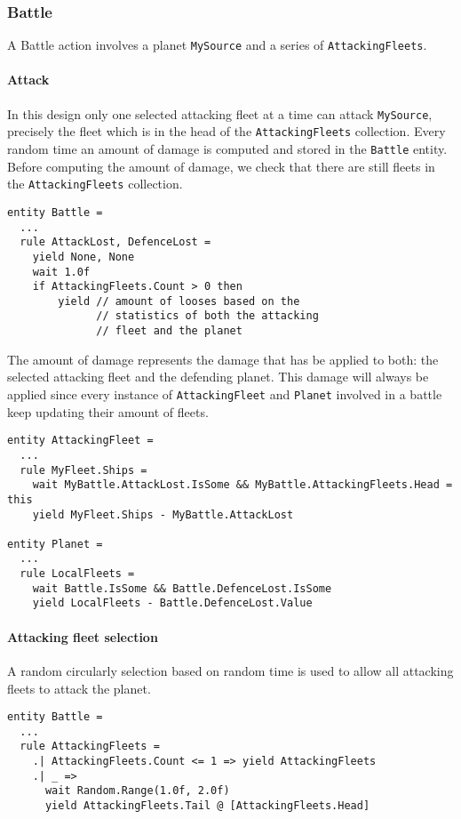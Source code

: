 \subsubsection{Battle}
\noindent
A Battle action involves a planet \texttt{MySource} and a series of \texttt{AttackingFleets}.
\paragraph{Attack} In this design only one selected attacking fleet at a time can attack \texttt{MySource}, precisely the fleet which is in the head of the \texttt{AttackingFleets} collection. Every random time an amount of damage is computed and stored in the \texttt{Battle} entity. Before computing the amount of damage, we check that there are still fleets in the \texttt{AttackingFleets} collection.

\begin{lstlisting}
entity Battle =
  ...
  rule AttackLost, DefenceLost =
    yield None, None
    wait 1.0f
    if AttackingFleets.Count > 0 then
        yield // amount of looses based on the  
              // statistics of both the attacking 
              // fleet and the planet	   
\end{lstlisting}

The amount of damage represents the damage that has be applied to both: the selected attacking fleet and the defending planet. This damage will always be applied since every instance of \texttt{AttackingFleet} and \texttt{Planet} involved in a battle keep updating their amount of fleets.


\begin{lstlisting}
entity AttackingFleet =
  ...
  rule MyFleet.Ships =
    wait MyBattle.AttackLost.IsSome && MyBattle.AttackingFleets.Head = this
    yield MyFleet.Ships - MyBattle.AttackLost
    
entity Planet =
  ...
  rule LocalFleets =
    wait Battle.IsSome && Battle.DefenceLost.IsSome
    yield LocalFleets - Battle.DefenceLost.Value
\end{lstlisting}

\paragraph{Attacking fleet selection}
A random circularly selection based on random time is used to allow all attacking fleets to attack the planet.
\begin{lstlisting}
entity Battle =
  ...
  rule AttackingFleets =
    .| AttackingFleets.Count <= 1 => yield AttackingFleets
    .| _ =>
      wait Random.Range(1.0f, 2.0f)
      yield AttackingFleets.Tail @ [AttackingFleets.Head]
\end{lstlisting}

